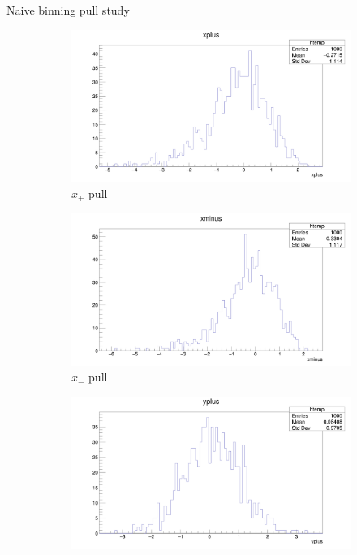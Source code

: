 \documentclass{beamer}
\begin{document}
\begin{frame}{Naive binning pull study}
  \begin{figure}
    \centering
    \vspace{-0.2cm}
    \begin{subfigure}{0.5\textwidth}
      \includegraphics[width = 1.0\textwidth]{NaivePulls/xplus1K1K.png}
      \caption{$x_+$ pull}
    \end{subfigure}%
    \begin{subfigure}{0.5\textwidth}
      \includegraphics[width = 1.0\textwidth]{NaivePulls/xminus1K1K.png}
      \caption{$x_-$ pull}
    \end{subfigure}
    \begin{subfigure}{0.5\textwidth}
      \includegraphics[width = 1.0\textwidth]{NaivePulls/yplus1K1K.png}

\end{subfigure}
\end{figure}
\end{frame}
\end{document}
